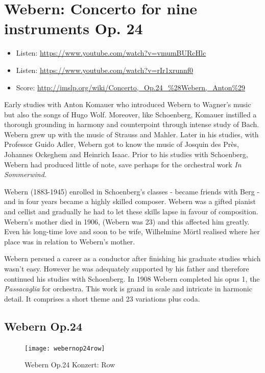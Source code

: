 \section{Webern: Concerto for nine instruments Op. 24}

\begin{itemize}
\item Listen: \url{https://www.youtube.com/watch?v=vmumBURcHlc}
\item Listen: \url{https://www.youtube.com/watch?v=rIr1xrunnf0}
\item Score: \url{http://imslp.org/wiki/Concerto,_Op.24_%28Webern,_Anton%29}
\end{itemize}

Early studies with Anton Komauer who introduced Webern to Wagner's music but also the songs of Hugo Wolf. Moreover, like Schoenberg, Komauer instilled a thorough grounding in harmony and counterpoint through intense study of Bach. Webern grew up with the music of Strauss and Mahler. Later in his studies, with Professor Guido Adler, Webern got to know the music of Josquin des Pr\`es, Johannes Ockeghem and Heinrich Isaac. Prior to his studies with Schoenberg, Webern had produced little of note, save perhaps for the orchestral work \textit{In Sommerwind}. 

Webern (1883-1945) enrolled in Schoenberg's classes - became friends with Berg - and in four years became a highly skilled composer. Webern was a gifted pianist and cellist and gradually he had to let these skills lapse in favour of composition. Webern's mother died in 1906, (Webern was 23) and this affected him greatly. Even his long-time love and soon to be wife, Wilhelmine M\"ortl realised where her place was in relation to Webern's mother. 

Webern persued a career as a conductor after finishing his graduate studies which wasn't easy. However he was adequately supported by his father and therefore continued his studies with Schoenberg. In 1908 Webern completed his opus 1, the \textit{Passacaglia} for orchestra. This work is grand in scale and intricate in harmonic detail. It comprises a short theme and 23 variations plus coda. 

\subsection{Webern Op.24}
 
\begin{figure}[H]
\centering
\texttt{[image: webernop24row]}\caption{Webern Op.24 Konzert: Row}
\label{fig:op24row}
\end{figure}



